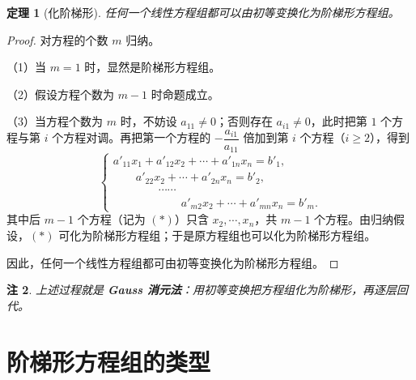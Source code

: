 \documentclass[UTF8,11pt]{ctexart}
\theoremstyle{cnthm}
\newtheorem{thm}{定理}[section]
\newtheorem{rem}[thm]{注}
\begin{document}
\begin{thm}[化阶梯形]
任何一个线性方程组都可以由初等变换化为阶梯形方程组。
\end{thm}

\begin{proof}
对方程的个数 $m$ 归纳。

（1）当 $m=1$ 时，显然是阶梯形方程组。

（2）假设方程个数为 $m-1$ 时命题成立。

（3）当方程个数为 $m$ 时，不妨设 $a_{11}\neq0$；否则存在 $a_{i1}\neq0$，此时把第 $1$ 个方程与第 $i$ 个方程对调。再把第一个方程的 $-\dfrac{a_{i1}}{a_{11}}$ 倍加到第 $i$ 个方程（$i\geq2$），得到
\[
\begin{cases}
a'_{11}x_1 + a'_{12}x_2 + \cdots + a'_{1n}x_n = b'_1,\\
\qquad a'_{22}x_2 + \cdots + a'_{2n}x_n = b'_2,\\
\qquad\qquad \cdots\cdots\\
\qquad\qquad\qquad a'_{m2}x_2 + \cdots + a'_{mn}x_n = b'_m.
\end{cases}
\]
其中后 $m-1$ 个方程（记为 $(*)$）只含 $x_2,\cdots,x_n$，共 $m-1$ 个方程。由归纳假设，$(*)$ 可化为阶梯形方程组；于是原方程组也可以化为阶梯形方程组。

因此，任何一个线性方程组都可由初等变换化为阶梯形方程组。
\end{proof}

\begin{rem}
上述过程就是 \textbf{Gauss 消元法}：用初等变换把方程组化为阶梯形，再逐层回代。
\end{rem}

\section{阶梯形方程组的类型}
\end{document}
